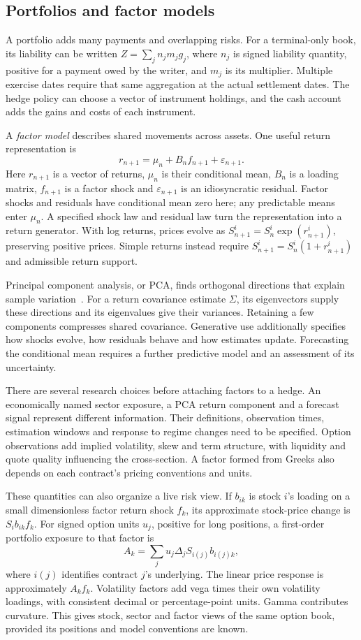 \documentclass[8pt]{strategynet-journal}
\begin{document}
\begin{SNcolumns}
\section{Portfolios and factor models}
A portfolio adds many payments and overlapping risks. For a terminal-only
book, its liability can be written $Z=\sum_j n_jm_jg_j$, where $n_j$ is signed
liability quantity, positive for a payment owed by the writer, and $m_j$ is
its multiplier. Multiple exercise dates require
that same aggregation at the actual settlement dates. The hedge policy can
choose a vector of instrument holdings, and the cash account adds the gains
and costs of each instrument.

A \emph{factor model} describes shared movements across assets. One useful
return representation is
\[
 r_{n+1}=\mu_n+B_n f_{n+1}+\varepsilon_{n+1}.
\]
Here $r_{n+1}$ is a vector of returns, $\mu_n$ is their conditional mean,
$B_n$ is a loading matrix, $f_{n+1}$ is a factor shock and $\varepsilon_{n+1}$
is an idiosyncratic residual. Factor shocks and residuals have conditional
mean zero here; any predictable means enter $\mu_n$. A specified shock law and residual law turn the
representation into a return generator. With log returns, prices evolve as
$S_{n+1}^i=S_n^i\exp(r_{n+1}^i)$, preserving positive prices. Simple returns
instead require $S_{n+1}^i=S_n^i(1+r_{n+1}^i)$ and admissible return support.

Principal component analysis, or PCA, finds orthogonal directions that explain
sample variation~\cite{pca}. For a return covariance estimate $\Sigma$, its eigenvectors
supply these directions and its eigenvalues give their variances. Retaining
a few components compresses shared covariance. Generative use additionally
specifies how shocks evolve, how residuals behave and how estimates update.
Forecasting the conditional mean requires a further predictive model and
an assessment of its uncertainty.

There are several research choices before attaching factors to a hedge.
An economically named sector exposure, a PCA return component and a forecast
signal represent different information. Their definitions, observation times,
estimation windows and response to regime changes need to be specified.
Option observations add implied volatility, skew and term structure, with
liquidity and quote quality influencing the cross-section. A factor formed
from Greeks also depends on each contract's pricing conventions and units.

These quantities can also organize a live risk view. If $b_{ik}$ is stock
$i$'s loading on a small dimensionless factor return shock $f_k$, its approximate
stock-price change is $S_i b_{ik}f_k$. For signed option units $u_j$, positive for long positions, a first-order
portfolio exposure to that factor is
\[
 A_k=\sum_j u_j\Delta_j S_{i(j)}b_{i(j)k},
\]
where $i(j)$ identifies contract $j$'s underlying. The linear price response is
approximately $A_k f_k$. Volatility factors add vega times their own volatility
loadings, with consistent decimal or percentage-point units. Gamma contributes
curvature. This gives stock, sector and factor views of the same option book,
provided its positions and model conventions are known.


\end{SNcolumns}
\end{document}
